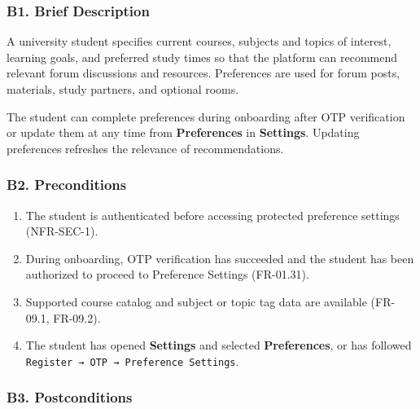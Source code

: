 \documentclass[12pt]{article}
\begin{document}
\hypertarget{sec:b1-brief-description}{}
\subsubsection*{B1. Brief Description}
\par\medskip

A university student specifies current courses, subjects and topics of interest, learning goals, and preferred study times so that the platform can recommend relevant forum discussions and resources. Preferences are used for forum posts, materials, study partners, and optional rooms.
\par\medskip

The student can complete preferences during onboarding after OTP verification or update them at any time from \textbf{Preferences} in \textbf{Settings}. Updating preferences refreshes the relevance of recommendations.
\par\medskip

\hypertarget{sec:b2-preconditions}{}
\subsubsection*{B2. Preconditions}
\par\medskip

\begin{enumerate}
\item The student is authenticated before accessing protected preference settings (NFR-SEC-1).
\item During onboarding, OTP verification has succeeded and the student has been authorized to proceed to Preference Settings (FR-01.31).
\item Supported course catalog and subject or topic tag data are available (FR-09.1, FR-09.2).
\item The student has opened \textbf{Settings} and selected \textbf{Preferences}, or has followed \texttt{Register → OTP → Preference Settings}.
\end{enumerate}
\par\medskip

\hypertarget{sec:b3-postconditions}{}
\subsubsection*{B3. Postconditions}
\par\medskip
\end{document}

